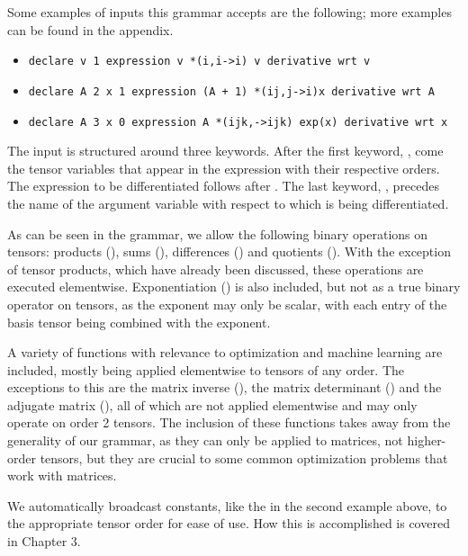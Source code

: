 \documentclass[12pt, a4paper]{report} %
\begin{document}
Some examples of inputs this grammar accepts are the following; more examples can be found in the appendix.

\begin{itemize}
    \item \texttt{declare v 1 expression v *(i,i->i) v derivative wrt v}
    \item \texttt{declare A 2 x 1 expression (A + 1) *(ij,j->i)x derivative wrt A}
    \item \texttt{declare A 3 x 0 expression A *(ijk,->ijk) exp(x) derivative wrt x}
\end{itemize}

The input is structured around three keywords.
After the first keyword, , come the tensor variables that appear in the expression with their respective orders.
The expression to be differentiated follows after .
The last keyword, , precedes the name of the argument variable with respect to which is being differentiated.

As can be seen in the grammar, we allow the following binary operations on tensors: products (\codeword{*(,->)}), sums (\codeword{+}), differences (\codeword{-}) and quotients (\codeword{/}).
With the exception of tensor products, which have already been discussed, these operations are executed elementwise.
Exponentiation (\codeword{^}) is also included, but not as a true binary operator on tensors, as the exponent may only be scalar, with each entry of the basis tensor being combined with the exponent.

A variety of functions with relevance to optimization and machine learning are included, mostly being applied elementwise to tensors of any order.
The exceptions to this are the matrix inverse (), the matrix determinant () and the adjugate matrix (), all of which are not applied elementwise and may only operate on order 2 tensors.
The inclusion of these functions takes away from the generality of our grammar, as they can only be applied to matrices, not higher-order tensors, but they are crucial to some common optimization problems that work with matrices.

We automatically broadcast constants, like the  in the second example above, to the appropriate tensor order for ease of use.
How this is accomplished is covered in Chapter 3.
\end{document}
